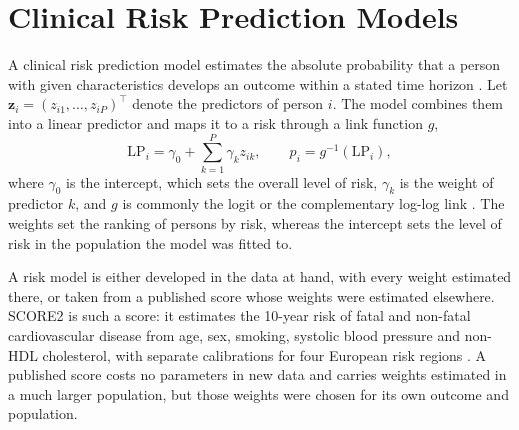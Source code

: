 
\section{Clinical Risk Prediction Models}
\label{sec:tech-risk-models}

A clinical risk prediction model estimates the absolute probability that a person with given characteristics develops an outcome within a stated time horizon \cite{steyerberg2019cpm}.
Let $\mathbf{z}_i = (z_{i1}, \dots, z_{iP})^\top$ denote the predictors of person $i$.
The model combines them into a linear predictor and maps it to a risk through a link function $g$,
\begin{equation}
  \mathrm{LP}_i = \gamma_0 + \sum_{k=1}^{P} \gamma_k z_{ik},
  \qquad
  p_i = g^{-1}(\mathrm{LP}_i),
  \label{eq:tech-risk-lp}
\end{equation}
where $\gamma_0$ is the intercept, which sets the overall level of risk, $\gamma_k$ is the weight of predictor $k$, and $g$ is commonly the logit or the complementary log-log link \cite{steyerberg2019cpm}.
The weights set the ranking of persons by risk, whereas the intercept sets the level of risk in the population the model was fitted to.

A risk model is either developed in the data at hand, with every weight estimated there, or taken from a published score whose weights were estimated elsewhere.
SCORE2 is such a score: it estimates the 10-year risk of fatal and non-fatal cardiovascular disease from age, sex, smoking, systolic blood pressure and non-HDL cholesterol, with separate calibrations for four European risk regions \cite{score2_2021}.
A published score costs no parameters in new data and carries weights estimated in a much larger population, but those weights were chosen for its own outcome and population.


